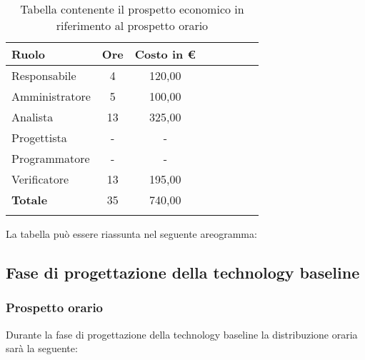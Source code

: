 			\begin{longtable}{|l|c|c|c|c|c|c|c|}
				\hline
				\rowcolor{lighter-grayer}
				\textbf{Ruolo} & \textbf{Ore} & \textbf{Costo in €} \\
				\hline
				\endfirsthead
				
				\hline
				Responsabile & 4 & 120,00\\
				\hline
				\hline
				Amministratore & 5 & 100,00\\
				\hline
				\hline
				Analista & 13 & 325,00\\
				\hline
				\hline
				Progettista & - & -\\
				\hline
				\hline
				Programmatore & - & -\\
				\hline
				\hline
				Verificatore & 13 & 195,00\\
				\hline
				\textbf{Totale} & 35 & 740,00\\
				\hline
				\caption{Tabella contenente il prospetto economico in riferimento al prospetto orario}
			\end{longtable}
			\pagebreak
		
			La tabella può essere riassunta nel seguente areogramma:

			\subsection{Fase di progettazione della technology baseline}
            \subsubsection{Prospetto orario}
			Durante la fase di progettazione della technology baseline la distribuzione oraria sarà la seguente:
			
